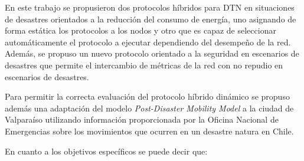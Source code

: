 

En este trabajo se propusieron dos protocolos híbridos para DTN en situaciones
de desastres orientados a la reducción del consumo de energía, uno asignando de
forma estática los protocolos a los nodos y otro que es capaz de seleccionar
automáticamente el protocolo a ejecutar dependiendo del desempeño de la red.
Además, se propuso un nuevo protocolo orientado a la seguridad en escenarios de
desastres que permite el intercambio de métricas de la red con no repudio en
escenarios de desastres.

Para permitir la correcta evaluación del protocolo híbrido dinámico se propuso
además una adaptación del modelo \textit{Post-Disaster Mobility Model} a la
ciudad de Valparaíso utilizando información proporcionada por la Oficina
Nacional de Emergencias sobre los movimientos que ocurren en un desastre natura
en Chile.



En cuanto a los objetivos específicos se puede decir que:

